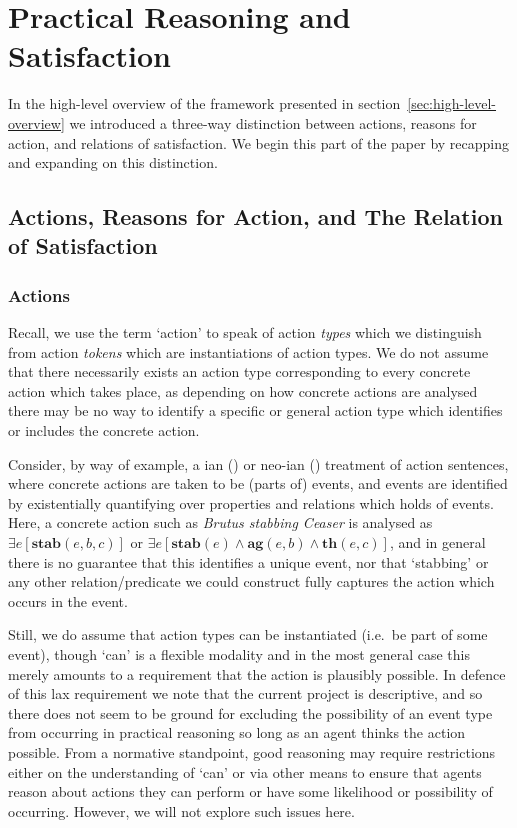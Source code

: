 \documentclass[10pt]{article}
\begin{document}
\section{Practical Reasoning and Satisfaction}
\label{sec:pract-reas-satisf}

In the high-level overview of the framework presented in section~\ref{sec:high-level-overview} we introduced a three-way distinction between actions, reasons for action, and relations of satisfaction.
We begin this part of the paper by recapping and expanding on this distinction.

\subsection{Actions, Reasons for Action, and The Relation of Satisfaction}
\label{sec:acti-reas-acti}

\subsubsection{Actions}
\label{sec:actions}

Recall, we use the term `action' to speak of action \emph{types} which we distinguish from action \emph{tokens} which are instantiations of action types.
We do not assume that there necessarily exists an action type corresponding to every concrete action which takes place, as depending on how concrete actions are analysed there may be no way to identify a specific or general action type which identifies or includes the concrete action.

Consider, by way of example, a \citeauthor{Davidson:1967aa}ian (\citeyear{Davidson:1967aa}) or neo-\citeauthor{Davidson:1967aa}ian (\cite{Carlson:1984aa,Parsons:1990aa}) treatment of action sentences, where concrete actions are taken to be (parts of) events, and events are identified by existentially quantifying over properties and relations which holds of events.
Here, a concrete action such as \emph{Brutus stabbing Ceaser} is analysed as \(\exists e[\mathbf{stab}(e,b,c)]\) or \(\exists e[\mathbf{stab}(e) \land \mathbf{ag}(e,b) \land \mathbf{th}(e,c)]\), and in general there is no guarantee that this identifies a unique event, nor that `stabbing' or any other relation/predicate we could construct fully captures the action which occurs in the event.

Still, we do assume that action types can be instantiated (i.e.\ be part of some event), though `can' is a flexible modality and in the most general case this merely amounts to a requirement that the action is plausibly possible.
In defence of this lax requirement we note that the current project is descriptive, and so there does not seem to be ground for excluding the possibility of an event type from occurring in practical reasoning so long as an agent thinks the action possible.
From a normative standpoint, good reasoning may require restrictions either on the understanding of `can' or via other means to ensure that agents reason about actions they can perform or have some likelihood or possibility of occurring.
However, we will not explore such issues here.
\end{document}
